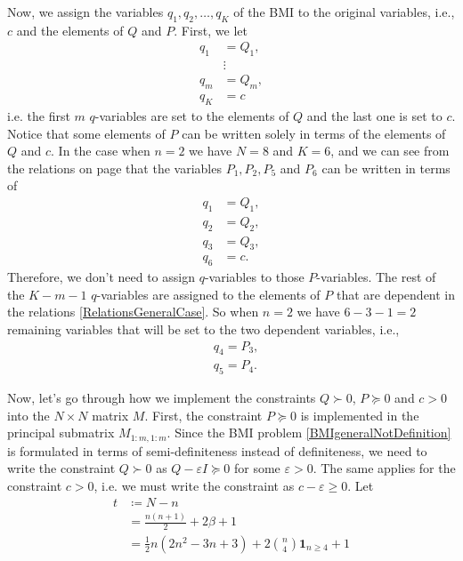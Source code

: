 \documentclass[a4paper,12pt,twoside,BCOR=10mm]{scrbook}
\begin{document}
Now, we assign the variables $q_1, q_2, \ldots, q_K$ of the BMI to the original variables, i.e., $c$ and the elements of $Q$ and $P$. First, we let
\begin{align*}
    q_1 &= Q_1,\\
    &\vdots\\
    q_m &= Q_m,\\
    q_K &= c
\end{align*}
i.e. the first $m$ $q$-variables are set to the elements of $Q$ and the last one is set to $c$. Notice that some elements of $P$ can be written solely in terms of the elements of $Q$ and $c$. In the case when $n = 2$ we have $N = 8$ and $K = 6$, and we can see from the relations on page \pageref{RelationsWrittenOut n2} that the variables $P_1, P_2, P_5$ and $P_6$ can be written in terms of
\begin{align*}
    q_1 &= Q_1,\\
    q_2 &= Q_2,\\
    q_3 &= Q_3,\\
    q_6 &= c.
\end{align*}
Therefore, we don't need to assign $q$-variables to those $P$-variables. The rest of the $K - m - 1$ $q$-variables are assigned to the elements of $P$ that are dependent in the relations \eqref{RelationsGeneralCase}. So when $n = 2$ we have $6 - 3 - 1 = 2$ remaining variables that will be set to the two dependent variables, i.e.,
\begin{align*}
    &q_4 = P_3,\\
    &q_5 = P_4.
\end{align*}

Now, let's go through how we implement the constraints $Q\succ 0$, $P \succeq 0$ and $c > 0$ into the $N\times N$ matrix $M$. First, the constraint $P \succeq 0$ is implemented in the principal submatrix $M_{1:m, 1:m}$. Since the BMI problem \eqref{BMIgeneralNotDefinition} is formulated in terms of semi-definiteness instead of definiteness, we need to write the constraint $Q \succ 0$ as $Q - \varepsilon I \succeq 0$ for some $\varepsilon > 0$. The same applies for the constraint $c > 0$, i.e. we must write the constraint as $c - \varepsilon \geq 0$. Let
\begin{align*}
    t &\coloneqq N - n\\
    &= \frac{n(n+1)}{2} + 2\beta + 1\\
    &= \frac{1}{2}n(2n^2 - 3n + 3) + 2\binom{n}{4}\mathbf{1}_{n\geq 4} + 1
\end{align*}
\end{document}
